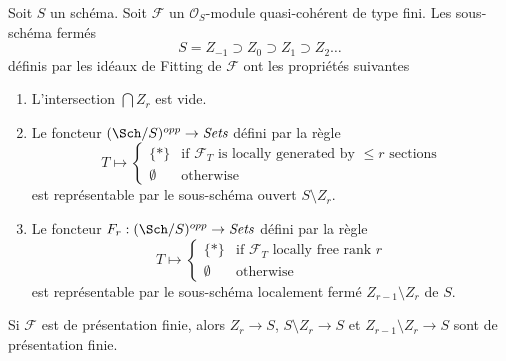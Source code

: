 \begin{lemma}
\label{lemma-locally-free-rank-r-pullback}
Soit  $S$  un schéma. Soit  $\mathcal{F}$  un  $\mathcal{O}_S$-module
quasi-cohérent de type fini. Les sous-schéma fermés
$$
S = Z_{-1} \supset Z_0 \supset Z_1 \supset Z_2 \ldots
$$
définis par les idéaux de Fitting de  $\mathcal{F}$  ont les propriétés suivantes
\begin{enumerate}
\item L’intersection  $\bigcap Z_r$  est vide.
\item Le foncteur  $(\Sch/S)^{opp} \to \textit{Sets}$  défini par la règle
$$
T \longmapsto
\left\{
\begin{matrix}
\{*\} & \text{if }\mathcal{F}_T\text{ is locally generated by }
\leq r\text{ sections} \\
\emptyset & \text{otherwise}
\end{matrix}
\right.
$$
est représentable par le sous-schéma ouvert  $S \setminus Z_r$.
\item Le foncteur  $F_r : (\Sch/S)^{opp} \to \textit{Sets}$  défini par la règle
$$
T \longmapsto
\left\{
\begin{matrix}
\{*\} & \text{if }\mathcal{F}_T\text{ locally free rank }r\\
\emptyset & \text{otherwise}
\end{matrix}
\right.
$$
est représentable par le sous-schéma localement fermé  $Z_{r - 1} \setminus Z_r$  de
 $S$.
\end{enumerate}
Si  $\mathcal{F}$  est de présentation finie, alors  $Z_r \to S$,  $S \setminus Z_r \to S$ et
 $Z_{r - 1} \setminus Z_r \to S$  sont de présentation finie.
\end{lemma}

